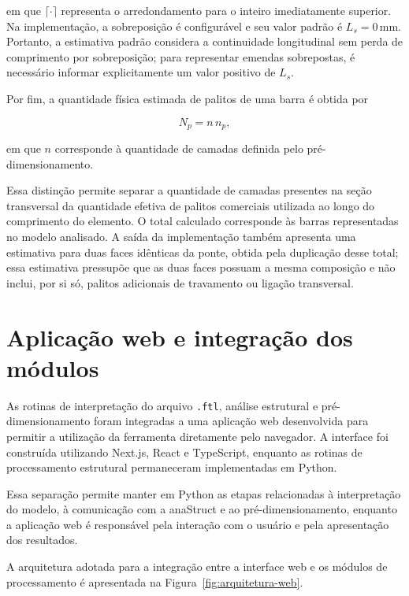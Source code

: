 em que \(\lceil \cdot \rceil\) representa o arredondamento para o inteiro imediatamente superior. Na implementação, a sobreposição é configurável e seu valor padrão é \(L_s=0\,\mathrm{mm}\). Portanto, a estimativa padrão considera a continuidade longitudinal sem perda de comprimento por sobreposição; para representar emendas sobrepostas, é necessário informar explicitamente um valor positivo de \(L_s\).

Por fim, a quantidade física estimada de palitos de uma barra é obtida por

\begin{equation}
    N_p = n\,n_p,
\end{equation}

em que \(n\) corresponde à quantidade de camadas definida pelo pré-dimensionamento.

Essa distinção permite separar a quantidade de camadas presentes na seção transversal da quantidade efetiva de palitos comerciais utilizada ao longo do comprimento do elemento. O total calculado corresponde às barras representadas no modelo analisado. A saída da implementação também apresenta uma estimativa para duas faces idênticas da ponte, obtida pela duplicação desse total; essa estimativa pressupõe que as duas faces possuam a mesma composição e não inclui, por si só, palitos adicionais de travamento ou ligação transversal.

\section{Aplicação web e integração dos módulos}
\label{sec:metodologia-aplicacao-web}

As rotinas de interpretação do arquivo \texttt{.ftl}, análise estrutural e pré-dimensionamento foram integradas a uma aplicação web desenvolvida para permitir a utilização da ferramenta diretamente pelo navegador. A interface foi construída utilizando Next.js, React e TypeScript, enquanto as rotinas de processamento estrutural permaneceram implementadas em Python.

Essa separação permite manter em Python as etapas relacionadas à interpretação do modelo, à comunicação com a anaStruct e ao pré-dimensionamento, enquanto a aplicação web é responsável pela interação com o usuário e pela apresentação dos resultados.

A arquitetura adotada para a integração entre a interface web e os módulos de processamento é apresentada na Figura~\ref{fig:arquitetura-web}.


